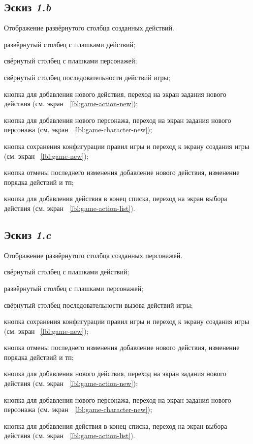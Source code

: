 \subsection{Эскиз \emph{1.b}}

Отображение развёрнутого столбца созданных действий.

\begin{enumerate*}
    \item развёрнутый столбец с плашками действий;
    \item свёрнутый столбец с плашками персонажей;
    \item свёрнутый столбец последовательности действий игры;
    \item кнопка для добавления нового действия, переход на экран задания нового действия (см. экран ~\ref{lbl:game-action-new});
    \item кнопка для добавления нового персонажа, переход на экран задания нового персонажа (см. экран ~\ref{lbl:game-character-new});
    \item кнопка сохранения конфигурации правил игры и переход к экрану создания игры (см. экран ~\ref{lbl:game-new});
    \item кнопка отмены последнего изменения добавление нового действия, изменение порядка действий и тп;
    \item кнопка для добавления действия в конец списка, переход на экран выбора действия (см. экран ~\ref{lbl:game-action-list}).
\end{enumerate*}

\subsection{Эскиз \emph{1.c}}

Отображение развёрнутого столбца созданных персонажей.

\begin{enumerate*}
    \item свёрнутый столбец с плашками действий;
    \item развёрнутый столбец с плашками персонажей;
    \item свёрнутый столбец последовательности вызова действий игры;
    \item кнопка сохранения конфигурации правил игры и переход к экрану создания игры (см. экран ~\ref{lbl:game-new});
    \item кнопка отмены последнего изменения добавление нового действия, изменение порядка действий и тп;
    \item кнопка для добавления нового действия, переход на экран задания нового действия (см. экран ~\ref{lbl:game-action-new});
    \item кнопка для добавления нового персонажа, переход на экран задания нового персонажа (см. экран ~\ref{lbl:game-character-new});
    \item кнопка для добавления действия в конец списка, переход на экран выбора действия (см. экран ~\ref{lbl:game-action-list}).
\end{enumerate*}


